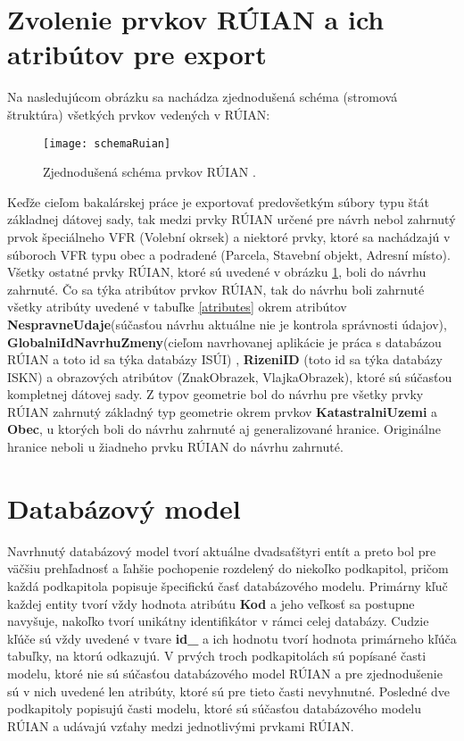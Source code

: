 \section {Zvolenie prvkov RÚIAN a ich atribútov pre export}
Na nasledujúcom obrázku sa nachádza zjednodušená schéma (stromová štruktúra) všetkých prvkov vedených v RÚIAN: 
\begin{figure}[H]
\texttt{[image: schemaRuian]}
\centering
\caption{Zjednodušená schéma prvkov RÚIAN \cite{Vdpman}.}
\label{schema}
\end{figure}
Keďže cieľom bakalárskej práce je exportovať predovšetkým súbory typu štát  základnej dátovej sady, tak medzi prvky RÚIAN určené pre návrh nebol zahrnutý prvok špeciálneho VFR (Volební okrsek) a niektoré prvky, ktoré sa nachádzajú v súboroch VFR typu obec a podradené (Parcela, Stavební objekt, Adresní místo). Všetky ostatné prvky RÚIAN, ktoré sú uvedené v obrázku \ref{schema}, boli do návrhu zahrnuté. Čo sa týka atribútov prvkov RÚIAN, tak do návrhu boli zahrnuté všetky atribúty uvedené v tabuľke \ref{atributes} okrem atribútov {\bf NespravneUdaje}(súčasťou návrhu aktuálne nie je kontrola správnosti údajov), {\bf GlobalniIdNavrhuZmeny}(cieľom navrhovanej aplikácie je práca s databázou RÚIAN a toto id sa týka databázy ISÚI) , {\bf RizeniID} (toto id sa týka databázy ISKN) a obrazových atribútov (ZnakObrazek, VlajkaObrazek), ktoré sú súčasťou kompletnej dátovej sady. Z typov geometrie bol do návrhu pre všetky prvky  RÚIAN zahrnutý základný typ geometrie okrem prvkov {\bf KatastralniUzemi} a {\bf Obec}, u ktorých boli do návrhu zahrnuté aj generalizované hranice. Originálne hranice neboli u žiadneho prvku RÚIAN do návrhu zahrnuté.
\section{Databázový model}
Navrhnutý databázový model tvorí aktuálne dvadsaťštyri entít a preto bol pre väčšiu prehľadnosť a ľahšie pochopenie rozdelený do niekoľko podkapitol, pričom každá podkapitola popisuje špecifickú časť databázového modelu. 
Primárny kľuč každej entity tvorí vždy hodnota atribútu {\bf Kod} a jeho veľkosť sa postupne navyšuje, nakoľko tvorí unikátny identifikátor v rámci celej databázy. Cudzie kľúče sú vždy uvedené v tvare {\bf id\_<nazov tabuľky>} a ich hodnotu tvorí hodnota primárneho kľúča tabuľky, na ktorú odkazujú. V prvých troch podkapitolách sú popísané časti modelu, ktoré nie sú súčasťou databázového model RÚIAN a pre zjednodušenie sú v nich uvedené len atribúty, ktoré sú pre tieto časti nevyhnutné. Posledné dve podkapitoly popisujú časti modelu, ktoré sú súčasťou databázového modelu RÚIAN a udávajú vzťahy medzi jednotlivými prvkami RÚIAN. 
